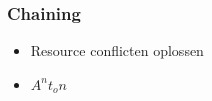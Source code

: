 \begin{frame}\frametitle{Chaining}
\begin{itemize}
    \item Resource conflicten oplossen
    \item $A^nt_on$
\end{itemize}
\end{frame}
